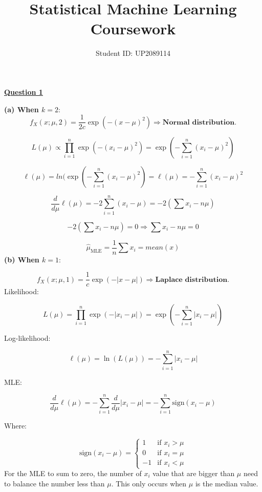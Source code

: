 \documentclass[12pt]{article}
\begin{document}
\vspace{-3em}
\title{Statistical Machine Learning Coursework}
\author{Student ID: UP2089114}
\maketitle


\noindent\textbf{\underline{Question 1}}\par

\vspace{1em}
\noindent\textbf{(a) When \( k = 2 \)}:
\[f_X(x; \mu, 2) = \frac{1}{2c} \exp\left( -(x - \mu)^2 \right) \Rightarrow {\textbf{Normal distribution}.} \]

\noindent{}

\[
L(\mu) \propto \prod_{i=1}^{n} \exp\left( -(x_i - \mu)^2 \right)
= \exp\left( -\sum_{i=1}^{n} (x_i - \mu)^2 \right)
\]

\noindent{}
\[\ell(\mu) = ln(\exp\left( -\sum_{i=1}^{n} (x_i - \mu)^2 \right) =
\ell(\mu) = -\sum_{i=1}^{n} (x_i - \mu)^2
\]

\noindent{}
\[
\frac{d}{d\mu} \ell(\mu) = -2 \sum_{i=1}^{n} (x_i - \mu)
= -2 \left( \sum x_i - n\mu \right)
\]

\noindent{}
\[
-2 \left( \sum x_i - n\mu \right) = 0
\Rightarrow \sum x_i - n\mu= 0\] 

\[\boxed {\hat{\mu}_{\text{MLE}} = \frac{1}{n} \sum x_i = mean(x)}\]
\vspace{0.5em}
\textbf{(b) When \( k = 1 \)}:

\[
f_X(x; \mu, 1) = \frac{1}{c} \exp\left( -|x - \mu| \right)
\Rightarrow \textbf{Laplace distribution}.
\]
\vspace{1em}
Likelihood:

\[
L(\mu) = \prod_{i=1}^{n} \exp(-|x_i - \mu|) = \exp\left( -\sum_{i=1}^{n} |x_i - \mu| \right)
\]

Log-likelihood:

\[
\ell(\mu) = \ln(L(\mu)) = -\sum_{i=1}^{n} |x_i - \mu|
\]

MLE:

\[
\frac{d}{d\mu} \ell(\mu) = -\sum_{i=1}^{n} \frac{d}{d\mu} |x_i - \mu| = -\sum_{i=1}^{n} \text{sign}(x_i - \mu)
\]

Where:

\[
\text{sign}(x_i - \mu) =
\begin{cases}
1 & \text{if } x_i > \mu \\
0 & \text{if } x_i = \mu \\
-1 & \text{if } x_i < \mu
\end{cases}
\]
For the MLE to sum to zero, the number of  $x_i$ value that are bigger than  $\mu$ need to balance the number less than  $\mu$. This only occurs when  $\mu$ is the median value.
\end{document}
